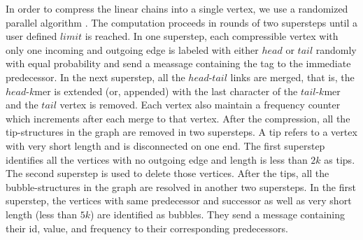 \documentclass[conference]{IEEEtran}
\begin{document}
In order to compress the linear chains into a single vertex, we use a randomized parallel algorithm \cite{algo:parallellistrank}. 
The computation proceeds in rounds of two supersteps until a user defined $limit$ is reached. 
In one superstep, each compressible vertex with only one incoming and outgoing edge is labeled with either $head$ or $tail$ randomly with equal probability and send a meassage containing the tag to the immediate predecessor. 
In the next superstep, all the $head$-$tail$ links are merged, that is, the $head$-$k$mer is extended (or, appended) with the last character of the $tail$-$k$mer and the $tail$ vertex is removed. 
Each vertex also maintain a frequency counter which increments after each merge to that vertex.
After the compression, all the tip-structures in the graph are removed in two supersteps. 
A tip refers to a vertex with very short length and is disconnected on one end.
The first superstep identifies all the vertices with no outgoing edge and  length is less than $2k$ as tips. 
The second superstep is used to delete those vertices.
After the tips, all the bubble-structures in the graph are resolved in another two supersteps. 
In the first superstep, the vertices with same predecessor and successor as well as very short length (less than $5k$) are identified as bubbles. They send a message containing their id, value, and frequency to their corresponding predecessors. 
\end{document}
